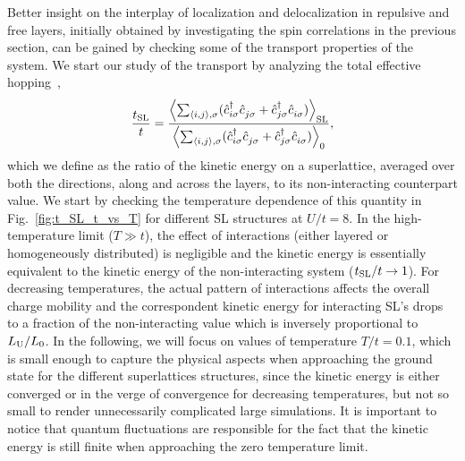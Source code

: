 \documentclass[aps,pra,reprint,twocolumn,showpacs,longbibliography,superscriptaddress]{revtex4-1}
\begin{document}
Better insight on the interplay of localization and delocalization in repulsive and free layers, initially obtained by investigating the spin correlations in the previous section, can be gained by checking some of the transport properties of the system. We start our study of the transport by analyzing the total effective hopping~\cite{White89b},
\begin{equation}
 \frac {t_{\rm SL}} {t} = \frac {\left\langle \sum_{\langle i,j\rangle,\sigma}
(\hat c^\dagger_{i\sigma} \hat c_{j \sigma}^{\phantom\dagger} +
\hat c^\dagger_{j\sigma} \hat c_{i \sigma}^{\phantom\dagger} )\right\rangle_{\rm SL}}{\left\langle \sum_{\langle i,j\rangle,\sigma}
(\hat c^\dagger_{i\sigma} \hat c_{j \sigma}^{\phantom\dagger} +
\hat c^\dagger_{j\sigma} \hat c_{i \sigma}^{\phantom\dagger} )\right\rangle_{0}},
\end{equation}
which we define as the ratio of the kinetic energy on a superlattice, averaged over both the directions, along and across the layers, to its non-interacting counterpart value. We start by checking the temperature dependence of this quantity in Fig.~\ref{fig:t_SL_t_vs_T} for different SL structures at $U/t=8$. In the high-temperature limit ($T\gg t$), the effect of interactions (either layered or homogeneously distributed) is negligible and the kinetic energy is essentially equivalent to the kinetic energy of the non-interacting system ($t_{\rm SL}/t\to1$). For decreasing temperatures, the actual pattern of interactions affects the overall charge mobility and  the correspondent kinetic energy for interacting SL's drops to a fraction of the non-interacting value which is inversely proportional to $L_{\rm U}/L_0$. In the following, we will focus on values of temperature $T/t=0.1$, which is small enough to capture the physical aspects when approaching the ground state for the different superlattices structures, since the kinetic energy is either converged or in the verge of convergence for decreasing temperatures, but not so small to render unnecessarily complicated large simulations. It is important to notice that quantum fluctuations are responsible for the fact that the kinetic energy is still finite when approaching the zero temperature limit. 
\end{document}
